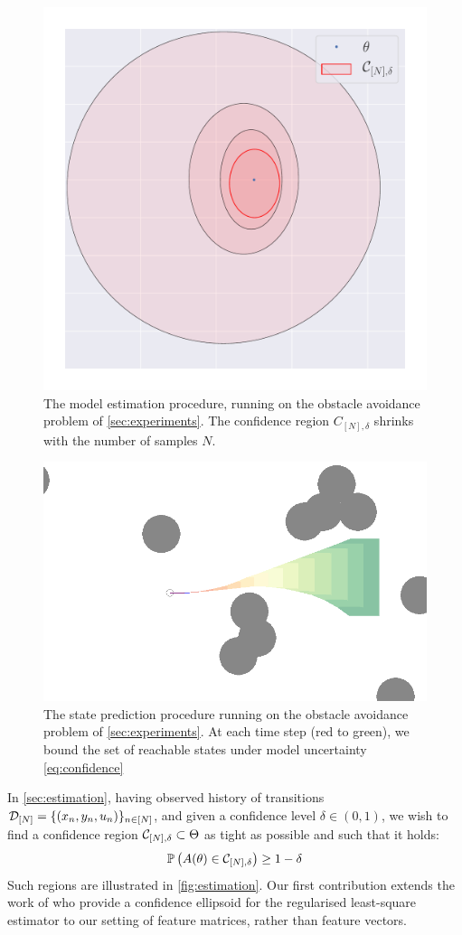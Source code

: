 \documentclass{article}
\begin{document}
\begin{figure}[t]
	\centering
	\includegraphics[trim={0 2cm 0 0}, clip, width=0.6\linewidth]{img/ellipsoid}
	\caption{The model estimation procedure, running on the obstacle avoidance problem of \autoref{sec:experiments}. The confidence region $C_{[N],\delta}$ shrinks with the number of samples $N$.}
	\label{fig:estimation}
\end{figure}

\begin{figure}[t]
	\centering
	\includegraphics[width=0.8\linewidth]{img/obstacle_small}
	\caption{The state prediction procedure running on the obstacle avoidance problem of \autoref{sec:experiments}. At each time step (red to green), we bound the set of reachable states under model uncertainty \eqref{eq:confidence}}
	\label{fig:prediction}
\end{figure}

In \autoref{sec:estimation}, having observed history of transitions $\mathcal{D}_{[N]} = \{(x_n, y_n,u_n)\}_{n\in[N]}$, and given a confidence level $\delta\in(0, 1)$, we wish to find a confidence region $\mathcal{C}_{[N],\delta} \subset \Theta$ as tight as possible and such that it holds:
\begin{align}
\mathbb{P}\left(A(\theta)\in \mathcal{C}_{[N],\delta}\right) \geq 1-\delta
\label{eq:confidence}
\end{align}
Such regions are illustrated in \autoref{fig:estimation}. Our first contribution extends the work of \citet{Abbasi2011} who provide a confidence ellipsoid for the regularised least-square estimator to our setting of feature matrices, rather than feature vectors.
\end{document}
